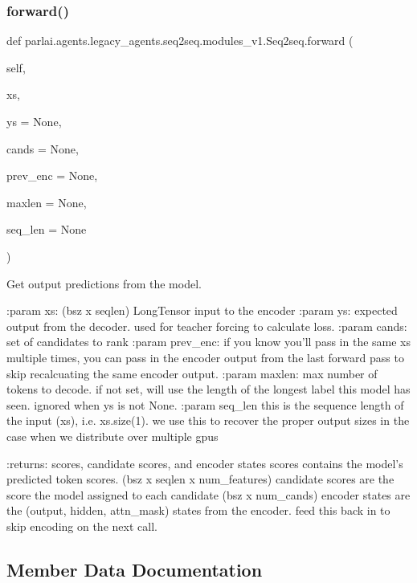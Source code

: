 \subsubsection{\texorpdfstring{forward()}{forward()}}
{\footnotesize\ttfamily def parlai.\+agents.\+legacy\+\_\+agents.\+seq2seq.\+modules\+\_\+v1.\+Seq2seq.\+forward (\begin{DoxyParamCaption}\item[{}]{self,  }\item[{}]{xs,  }\item[{}]{ys = {\ttfamily None},  }\item[{}]{cands = {\ttfamily None},  }\item[{}]{prev\+\_\+enc = {\ttfamily None},  }\item[{}]{maxlen = {\ttfamily None},  }\item[{}]{seq\+\_\+len = {\ttfamily None} }\end{DoxyParamCaption})}

\begin{DoxyVerb}Get output predictions from the model.

:param xs:          (bsz x seqlen) LongTensor input to the encoder
:param ys:          expected output from the decoder. used for teacher
            forcing to calculate loss.
:param cands:       set of candidates to rank
:param prev_enc:    if you know you'll pass in the same xs multiple
            times, you can pass in the encoder output from the
            last forward pass to skip recalcuating the same
            encoder output.
:param maxlen:      max number of tokens to decode. if not set, will
            use the length of the longest label this model
            has seen. ignored when ys is not None.
:param seq_len      this is the sequence length of the input (xs), i.e.
            xs.size(1). we use this to recover the proper
            output sizes in the case when we distribute over
            multiple gpus

:returns: scores, candidate scores, and encoder states
    scores contains the model's predicted token scores.
(bsz x seqlen x num_features)
    candidate scores are the score the model assigned to each candidate
(bsz x num_cands)
    encoder states are the (output, hidden, attn_mask) states from the
encoder. feed this back in to skip encoding on the next call.
\end{DoxyVerb}
 

\subsection{Member Data Documentation}
\mbox{\label{classparlai_1_1agents_1_1legacy__agents_1_1seq2seq_1_1modules__v1_1_1Seq2seq_ae2751bbf922e0897d10d904340f62a1c}} 
